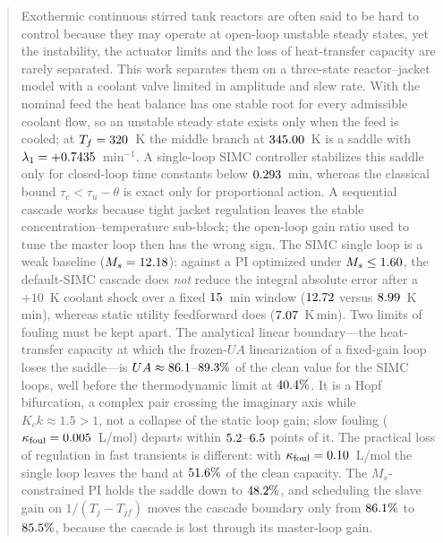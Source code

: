 \begin{abstract}
Exothermic continuous stirred tank reactors are often said to be hard to control because they may operate at open-loop unstable steady states, yet the instability, the actuator limits and the loss of heat-transfer capacity are rarely separated. This work separates them on a three-state reactor--jacket model with a coolant valve limited in amplitude and slew rate. With the nominal feed the heat balance has one stable root for every admissible coolant flow, so an unstable steady state exists only when the feed is cooled; at $T_f=\TfSad$~K the middle branch at $\TSad$~K is a saddle with $\lambda_1=+\lamASad$~min$^{-1}$. A single-loop SIMC controller stabilizes this saddle only for closed-loop time constants below $\tcMaxPI$~min, whereas the classical bound $\tau_c<\tau_u-\theta$ is exact only for proportional action. A sequential cascade works because tight jacket regulation leaves the stable concentration--temperature sub-block; the open-loop gain ratio used to tune the master loop then has the wrong sign. The SIMC single loop is a weak baseline ($M_s=\msSimc$): against a PI optimized under $M_s\le\msMax$, the default-SIMC cascade does \emph{not} reduce the integral absolute error after a $+10$~K coolant shock over a fixed $\horizonShockWin$~min window ($\iaeTjfCascade$ versus $\iaeTjfSisoopt$~K\,min), whereas static utility feedforward does ($\iaeTjfCascadeff$~K\,min). Two limits of fouling must be kept apart. The analytical linear boundary---the heat-transfer capacity at which the frozen-$UA$ linearization of a fixed-gain loop loses the saddle---is $UA\approx\fstabCascade$--$\fstabSiso\%$ of the clean value for the SIMC loops, well before the thermodynamic limit at $\fcritSad\%$. It is a Hopf bifurcation, a complex pair crossing the imaginary axis while $K_ck\approx1.5>1$, not a collapse of the static loop gain; slow fouling ($\kappa_{\mathrm{foul}}=\kappaSweepLo$~L/mol) departs within $\gapSlowSiso$--$\gapSlowCascade$ points of it. The practical loss of regulation in fast transients is different: with $\kappa_{\mathrm{foul}}=\kappaFoul$~L/mol the single loop leaves the band at $\uaRunPctSadSiso\%$ of the clean capacity. The $M_s$-constrained PI holds the saddle down to $\fstabSisoopt\%$, and scheduling the slave gain on $1/(T_j-T_{jf})$ moves the cascade boundary only from $\fstabCascade\%$ to $\fstabCascadegs\%$, because the cascade is lost through its master-loop gain.
\end{abstract}
